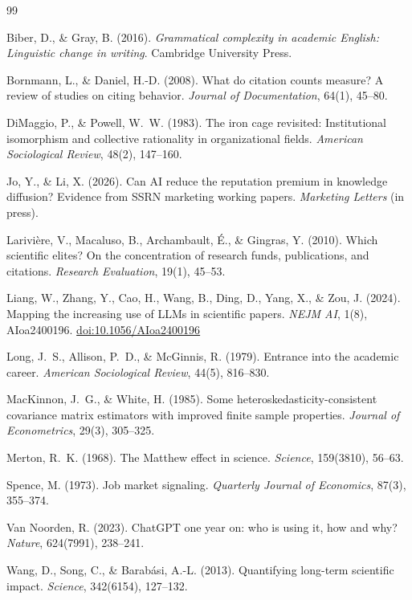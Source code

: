 \documentclass[12pt,a4paper]{article}
\newcommand{\doi}[1]{\href{https://doi.org/#1}{doi:#1}}
\begin{document}
\begin{thebibliography}{99}

Biber, D., \& Gray, B. (2016).
\newblock \textit{Grammatical complexity in academic English: Linguistic change
  in writing}.
\newblock Cambridge University Press.

Bornmann, L., \& Daniel, H.-D. (2008).
\newblock What do citation counts measure? A review of studies on citing
  behavior.
\newblock \textit{Journal of Documentation}, 64(1), 45--80.

DiMaggio, P., \& Powell, W.~W. (1983).
\newblock The iron cage revisited: Institutional isomorphism and collective
  rationality in organizational fields.
\newblock \textit{American Sociological Review}, 48(2), 147--160.

Jo, Y., \& Li, X. (2026).
\newblock Can AI reduce the reputation premium in knowledge diffusion?
  Evidence from SSRN marketing working papers.
\newblock \textit{Marketing Letters} (in press).

Larivi\`{e}re, V., Macaluso, B., Archambault, \'{E}., \& Gingras, Y. (2010).
\newblock Which scientific elites? On the concentration of research funds,
  publications, and citations.
\newblock \textit{Research Evaluation}, 19(1), 45--53.

Liang, W., Zhang, Y., Cao, H., Wang, B., Ding, D., Yang, X.,
  \& Zou, J. (2024).
\newblock Mapping the increasing use of LLMs in scientific papers.
\newblock \textit{NEJM AI}, 1(8), AIoa2400196.
\newblock \doi{10.1056/AIoa2400196}

Long, J.~S., Allison, P.~D., \& McGinnis, R. (1979).
\newblock Entrance into the academic career.
\newblock \textit{American Sociological Review}, 44(5), 816--830.

MacKinnon, J.~G., \& White, H. (1985).
\newblock Some heteroskedasticity-consistent covariance matrix estimators with
  improved finite sample properties.
\newblock \textit{Journal of Econometrics}, 29(3), 305--325.

Merton, R.~K. (1968).
\newblock The Matthew effect in science.
\newblock \textit{Science}, 159(3810), 56--63.

Spence, M. (1973).
\newblock Job market signaling.
\newblock \textit{Quarterly Journal of Economics}, 87(3), 355--374.

Van Noorden, R. (2023).
\newblock ChatGPT one year on: who is using it, how and why?
\newblock \textit{Nature}, 624(7991), 238--241.

Wang, D., Song, C., \& Barab\'{a}si, A.-L. (2013).
\newblock Quantifying long-term scientific impact.
\newblock \textit{Science}, 342(6154), 127--132.

\end{thebibliography}
\end{document}
